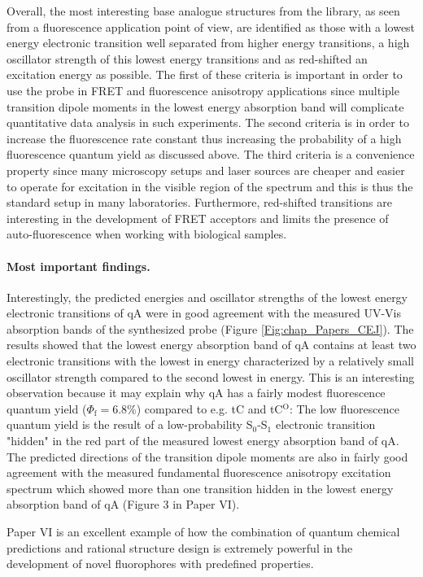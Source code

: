  Overall, the most interesting base analogue structures from the library, as seen from a fluorescence application point of view, are identified as those with a lowest energy electronic transition well separated from higher energy transitions, a high oscillator strength of this lowest energy transitions and as red-shifted an excitation energy as possible. The first of these criteria is important in order to use the probe in FRET and fluorescence anisotropy applications since multiple transition dipole moments in the lowest energy absorption band will complicate quantitative data analysis in such experiments. The second criteria is in order to increase the fluorescence rate constant thus increasing the probability of a high fluorescence quantum yield as discussed above. The third criteria is a convenience property since many microscopy setups and laser sources are cheaper and easier to operate for excitation in the visible region of the spectrum and this is thus the standard setup in many laboratories. Furthermore, red-shifted transitions are interesting in the development of FRET acceptors and limits the presence of auto-fluorescence when working with biological samples.

 \paragraph{Most important findings.}Interestingly, the predicted energies and oscillator strengths of the lowest energy electronic transitions of qA were in good agreement with the measured UV-Vis absorption bands of the synthesized probe (Figure \ref{Fig:chap_Papers_CEJ}). The results showed that the lowest energy absorption band of qA contains at least two electronic transitions with the lowest in energy characterized by a relatively small oscillator strength compared to the second lowest in energy. This is an interesting observation because it may explain why qA has a fairly modest fluorescence quantum yield ($\Phi_\mathrm{f} = 6.8\%$) compared to e.g. tC and tC$^\mathrm{O}$: The low fluorescence quantum yield is the result of a low-probability S$_0$-S$_1$ electronic transition "hidden" in the red part of the measured lowest energy absorption band of qA. The predicted directions of the transition dipole moments are also in fairly good agreement with the measured fundamental fluorescence anisotropy excitation spectrum which showed more than one transition hidden in the lowest energy absorption band of qA (Figure 3 in Paper VI).

 Paper VI is an excellent example of how the combination of quantum chemical predictions and rational structure design is extremely powerful in the development of novel fluorophores with predefined properties.

